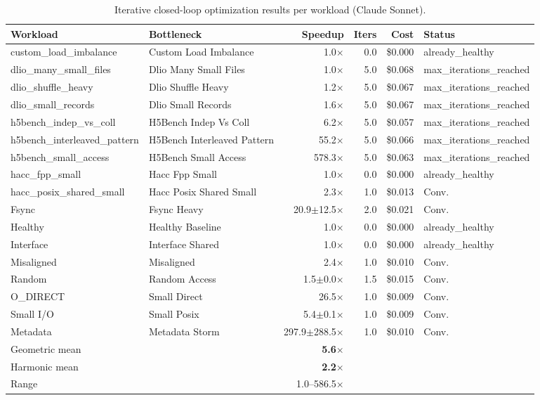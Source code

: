 \begin{table}[t]
\caption{Iterative closed-loop optimization results per workload
(Claude Sonnet).}
\label{tab:iterative_results}
\centering\small
\begin{tabular}{llrrrl}
\toprule
\textbf{Workload} & \textbf{Bottleneck} & \textbf{Speedup} & \textbf{Iters} & \textbf{Cost} & \textbf{Status} \\
\midrule
custom_load_imbalance & Custom Load Imbalance & 1.0$\times$ & 0.0 & \$0.000 & already_healthy \\
dlio_many_small_files & Dlio Many Small Files & 1.0$\times$ & 5.0 & \$0.068 & max_iterations_reached \\
dlio_shuffle_heavy & Dlio Shuffle Heavy & 1.2$\times$ & 5.0 & \$0.067 & max_iterations_reached \\
dlio_small_records & Dlio Small Records & 1.6$\times$ & 5.0 & \$0.067 & max_iterations_reached \\
h5bench_indep_vs_coll & H5Bench Indep Vs Coll & 6.2$\times$ & 5.0 & \$0.057 & max_iterations_reached \\
h5bench_interleaved_pattern & H5Bench Interleaved Pattern & 55.2$\times$ & 5.0 & \$0.066 & max_iterations_reached \\
h5bench_small_access & H5Bench Small Access & 578.3$\times$ & 5.0 & \$0.063 & max_iterations_reached \\
hacc_fpp_small & Hacc Fpp Small & 1.0$\times$ & 0.0 & \$0.000 & already_healthy \\
hacc_posix_shared_small & Hacc Posix Shared Small & 2.3$\times$ & 1.0 & \$0.013 & Conv. \\
Fsync & Fsync Heavy & 20.9$\pm$12.5$\times$ & 2.0 & \$0.021 & Conv. \\
Healthy & Healthy Baseline & 1.0$\times$ & 0.0 & \$0.000 & already_healthy \\
Interface & Interface Shared & 1.0$\times$ & 0.0 & \$0.000 & already_healthy \\
Misaligned & Misaligned & 2.4$\times$ & 1.0 & \$0.010 & Conv. \\
Random & Random Access & 1.5$\pm$0.0$\times$ & 1.5 & \$0.015 & Conv. \\
O_DIRECT & Small Direct & 26.5$\times$ & 1.0 & \$0.009 & Conv. \\
Small I/O & Small Posix & 5.4$\pm$0.1$\times$ & 1.0 & \$0.009 & Conv. \\
Metadata & Metadata Storm & 297.9$\pm$288.5$\times$ & 1.0 & \$0.010 & Conv. \\
\midrule
\multicolumn{2}{l}{Geometric mean} & \textbf{5.6$\times$} & & & \\
\multicolumn{2}{l}{Harmonic mean} & \textbf{2.2$\times$} & & & \\
\multicolumn{2}{l}{Range} & 1.0--586.5$\times$ & & & \\
\bottomrule
\end{tabular}
\end{table}